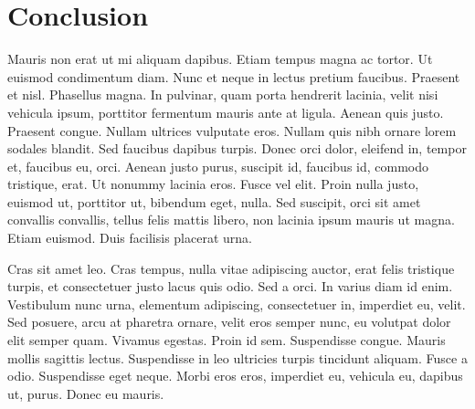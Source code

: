 \chapter{Conclusion}\label{Conclusion}
Mauris non erat ut mi aliquam dapibus. Etiam tempus magna ac tortor. Ut euismod condimentum diam. Nunc et neque in lectus pretium faucibus. Praesent et nisl. Phasellus magna. In pulvinar, quam porta hendrerit lacinia, velit nisi vehicula ipsum, porttitor fermentum mauris ante at ligula. Aenean quis justo. Praesent congue. Nullam ultrices vulputate eros. Nullam quis nibh ornare lorem sodales blandit. Sed faucibus dapibus turpis. Donec orci dolor, eleifend in, tempor et, faucibus eu, orci. Aenean justo purus, suscipit id, faucibus id, commodo tristique, erat. Ut nonummy lacinia eros. Fusce vel elit. Proin nulla justo, euismod ut, porttitor ut, bibendum eget, nulla. Sed suscipit, orci sit amet convallis convallis, tellus felis mattis libero, non lacinia ipsum mauris ut magna. Etiam euismod. Duis facilisis placerat urna. 

Cras sit amet leo. Cras tempus, nulla vitae adipiscing auctor, erat felis tristique turpis, et consectetuer justo lacus quis odio. Sed a orci. In varius diam id enim. Vestibulum nunc urna, elementum adipiscing, consectetuer in, imperdiet eu, velit. Sed posuere, arcu at pharetra ornare, velit eros semper nunc, eu volutpat dolor elit semper quam. Vivamus egestas. Proin id sem. Suspendisse congue. Mauris mollis sagittis lectus. Suspendisse in leo ultricies turpis tincidunt aliquam. Fusce a odio. Suspendisse eget neque. Morbi eros eros, imperdiet eu, vehicula eu, dapibus ut, purus. Donec eu mauris. 
